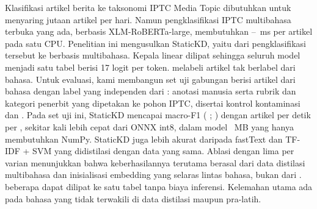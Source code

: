 Klasifikasi artikel berita ke taksonomi IPTC Media Topic dibutuhkan untuk menyaring jutaan artikel per hari. Namun pengklasifikasi IPTC multibahasa terbuka yang ada, berbasis XLM-RoBERTa-large, membutuhkan --~ms per artikel pada satu  CPU. Penelitian ini mengusulkan StaticKD, yaitu  dari pengklasifikasi tersebut ke  berbasis  multibahasa. Kepala linear  dilipat sehingga seluruh model menjadi satu tabel berisi 17 logit per token.  melabeli  artikel tak berlabel dari  bahasa. Untuk evaluasi, kami membangun set uji gabungan berisi  artikel dari  bahasa dengan label yang independen dari : anotasi manusia serta rubrik dan kategori penerbit yang dipetakan ke pohon IPTC, disertai kontrol kontaminasi dan . Pada set uji ini, StaticKD mencapai macro-F1  ( ; ) dengan   artikel per detik per , sekitar  kali lebih cepat dari  ONNX int8, dalam model ~MB yang hanya membutuhkan NumPy. StaticKD juga lebih akurat daripada fastText dan TF-IDF + SVM yang didistilasi dengan data yang sama. Ablasi dengan lima  per varian menunjukkan bahwa keberhasilannya terutama berasal dari data distilasi multibahasa dan inisialisasi embedding yang selaras lintas bahasa, bukan dari .  beberapa  dapat dilipat ke satu tabel tanpa biaya inferensi. Kelemahan utama ada pada bahasa yang tidak terwakili di data distilasi maupun pra-latih.
